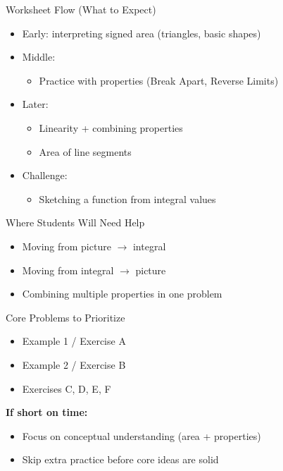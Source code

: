 \documentclass[dvipsnames]{beamer}
\begin{document}
\begin{frame}{Worksheet Flow (What to Expect)}
\begin{itemize}
\item Early: interpreting signed area (triangles, basic shapes)
\item Middle:
\begin{itemize}
\item Practice with properties (Break Apart, Reverse Limits)
\end{itemize}
\item Later:
\begin{itemize}
\item Linearity + combining properties
\item Area of line segments
\end{itemize}
\item Challenge:
\begin{itemize}
\item Sketching a function from integral values
\end{itemize}
\end{itemize}
\end{frame}

\begin{frame}{Where Students Will Need Help}
\begin{itemize}
\item Moving from picture $\rightarrow$ integral
\item Moving from integral $\rightarrow$ picture
\item Combining multiple properties in one problem
\end{itemize}

\end{frame}

\begin{frame}{Core Problems to Prioritize}
\begin{itemize}
\item Example 1 / Exercise A
\item Example 2 / Exercise B
\item Exercises C, D, E, F
\end{itemize}

\vspace{0.3cm}

\textbf{If short on time:}
\begin{itemize}
\item Focus on conceptual understanding (area + properties)
\item Skip extra practice before core ideas are solid
\end{itemize}
\end{frame}
\end{document}

